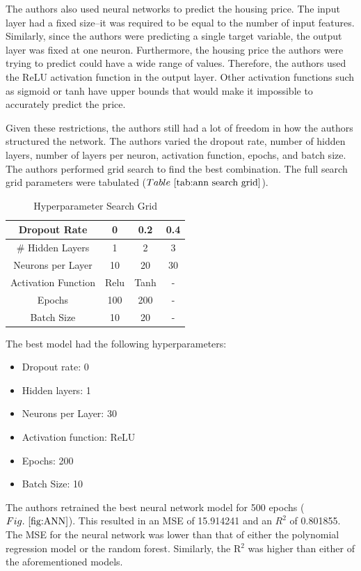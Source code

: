 \documentclass[conference, 11pt]{IEEEtran}
\begin{document}
The authors also used neural networks to predict the housing price. The input layer had a fixed size--it was required to be equal to the number of input features. Similarly, since the authors were predicting a single target variable, the output layer was fixed at one neuron. Furthermore, the housing price the authors were trying to predict could have a wide range of values. Therefore, the authors used the ReLU activation function in the output layer. Other activation functions such as sigmoid or tanh have upper bounds that would make it impossible to accurately predict the price.

Given these restrictions, the authors still had a lot of freedom in how the authors structured the network. The authors varied the dropout rate, number of hidden layers, number of layers per neuron, activation function, epochs, and batch size. The authors performed grid search to find the best combination. The full search grid parameters were tabulated ($Table~\ref{tab:ann search grid}$). 

\begin{table}[h]
\centering
\caption{Hyperparameter Search Grid}
\begin{tabular}{|c|c|c|c|}
\hline
Dropout Rate & 0 & 0.2 & 0.4 \\
\hline
# Hidden Layers & 1 & 2 & 3 \\
\hline
Neurons per Layer & 10 & 20 & 30 \\
\hline
Activation Function & Relu & Tanh & - \\
\hline
Epochs & 100 & 200 & - \\
\hline
Batch Size & 10 & 20 & - \\
\hline
\end{tabular}
\label{tab:ann search grid}
\end{table}

The best model had the following hyperparameters: 
\begin{itemize}
    \item Dropout rate: 0
    \item Hidden layers: 1
    \item Neurons per Layer: 30
    \item Activation function: ReLU
    \item Epochs: 200
    \item Batch Size: 10    
\end{itemize}
The authors retrained the best neural network model for 500 epochs ($Fig.~\ref{fig:ANN}$). This resulted in an MSE of 15.914241 and an $R^2$ of 0.801855. The MSE for the neural network was lower than that of either the polynomial regression model or the random forest. Similarly, the R$^2$ was higher than either of the aforementioned models.
\end{document}
